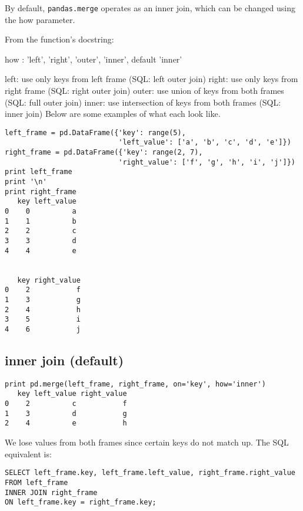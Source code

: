 \documentclass[]{article}
\begin{document}
By default, \texttt{pandas.merge} operates as an inner join, which can be changed using the how parameter.

From the function's docstring:

how : {'left', 'right', 'outer', 'inner'}, default 'inner'

left: use only keys from left frame (SQL: left outer join)
right: use only keys from right frame (SQL: right outer join)
outer: use union of keys from both frames (SQL: full outer join)
inner: use intersection of keys from both frames (SQL: inner join)
Below are some examples of what each look like.


\begin{framed}
\begin{verbatim}
left_frame = pd.DataFrame({'key': range(5), 
                           'left_value': ['a', 'b', 'c', 'd', 'e']})
right_frame = pd.DataFrame({'key': range(2, 7), 
                           'right_value': ['f', 'g', 'h', 'i', 'j']})
print left_frame
print '\n'
print right_frame
   key left_value
0    0          a
1    1          b
2    2          c
3    3          d
4    4          e


   key right_value
0    2           f
1    3           g
2    4           h
3    5           i
4    6           j
\end{verbatim}
\end{framed}
\newpage
\subsection{inner join (default)}

\begin{framed}
\begin{verbatim}
print pd.merge(left_frame, right_frame, on='key', how='inner')
   key left_value right_value
0    2          c           f
1    3          d           g
2    4          e           h
\end{verbatim}
\end{framed}

We lose values from both frames since certain keys do not match up. The SQL equivalent is:

\begin{verbatim}
SELECT left_frame.key, left_frame.left_value, right_frame.right_value
FROM left_frame
INNER JOIN right_frame
ON left_frame.key = right_frame.key;
\end{verbatim}
\end{document}
